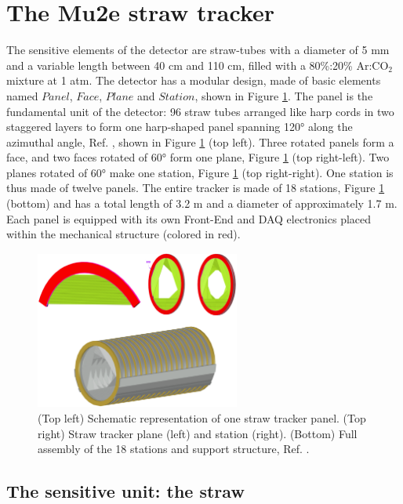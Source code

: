 \section{The Mu2e straw tracker}\label{geomtra}
The sensitive elements of the detector are straw-tubes with a diameter of 5 mm and a variable length between 40 cm and 110 cm, 
filled with a 80\%:20\% Ar:CO$_2$ mixture at 1 atm.  
The detector has a modular design, made of basic elements named $Panel$, $Face$, 
$Plane$ and $Station$, shown in Figure \ref{fig:trkpanel}. 
The panel is the fundamental unit of the detector: 96 straw tubes arranged like 
harp cords in two staggered layers to form one harp-shaped panel spanning 120° along the azimuthal angle, Ref. \cite{bartoszek2015mu2e}, 
shown in Figure \ref{fig:trkpanel} (top left).
Three rotated panels form a face, and two faces rotated of 60° form one plane, Figure \ref{fig:trkpanel} (top right-left). 
Two planes rotated of 60° make one station, Figure \ref{fig:trkpanel} (top right-right).
One station is thus made of twelve panels. The entire tracker is made of 18 stations, Figure \ref{fig:trkpanel} (bottom) 
and has a total length of 3.2 m and a diameter of approximately 1.7 m.
Each panel is equipped with its own Front-End and DAQ electronics placed within the mechanical structure (colored in red).
\begin{figure}[!h]
\centering
\includegraphics[width =0.6\textwidth]{figures/png/Screenshot_20240306_222803.png}
\caption[The straw tracker components.]{(Top left) Schematic representation of one straw tracker panel. (Top right) 
Straw tracker plane (left) and station (right). (Bottom) Full assembly of the 18 
stations and support structure, Ref. \cite{bartoszek2015mu2e}.}
\label{fig:trkpanel}
\end{figure}
\subsection{The sensitive unit: the straw}

